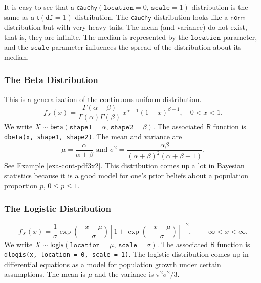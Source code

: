 \documentclass[captions=tableheading]{scrbook}
\begin{document}
It is easy to see that a \(\mathsf{cauchy}(\mathtt{location}=0,\,\mathtt{scale}=1)\) distribution is the same as a \(\mathsf{t}(\mathtt{df}=1)\) distribution. The \(\mathsf{cauchy}\) distribution looks like a \(\mathsf{norm}\) distribution but with very heavy tails. The mean (and variance) do not exist, that is, they are infinite. The median is represented by the \(\mathtt{location}\) parameter, and the \(\mathtt{scale}\) parameter influences the spread of the distribution about its median.
\subsubsection{The Beta Distribution}
\label{sec-1-5-3-2}
\label{sub-The-Beta-Distribution}


This is a generalization of the continuous uniform distribution.
\begin{equation}
f_{X}(x)=\frac{\Gamma(\alpha+\beta)}{\Gamma(\alpha)\Gamma(\beta)}\, x^{\alpha-1}(1-x)^{\beta-1},\quad 0 < x < 1.
\end{equation}
We write \(X\sim\mathsf{beta}(\mathtt{shape1}=\alpha,\,\mathtt{shape2}=\beta)\). The associated \(\mathsf{R}\) function is \texttt{dbeta(x, shape1, shape2)}. The mean and variance are
\begin{equation} 
\mu=\frac{\alpha}{\alpha+\beta}\mbox{ and }\sigma^{2}=\frac{\alpha\beta}{\left(\alpha+\beta\right)^{2}\left(\alpha+\beta+1\right)}.
\end{equation}
See Example \ref{exa-cont-pdf3x2}. This distribution comes up a lot in Bayesian statistics because it is a good model for one's prior beliefs about a population proportion \(p\), \(0\leq p\leq1\).
\subsubsection{The Logistic Distribution}
\label{sec-1-5-3-3}
\label{sub-The-Logistic-Distribution}


\begin{equation}
f_{X}(x)=\frac{1}{\sigma}\exp\left(-\frac{x-\mu}{\sigma}\right)\left[1+\exp\left(-\frac{x-\mu}{\sigma}\right)\right]^{-2},\quad -\infty < x < \infty.
\end{equation}
We write \(X\sim\mathsf{logis}(\mathtt{location}=\mu,\,\mathtt{scale}=\sigma)\). The associated \(\mathsf{R}\) function is \texttt{dlogis(x, location = 0, scale = 1)}. The logistic distribution comes up in differential equations as a model for population growth under certain assumptions. The mean is \(\mu\) and the variance is \(\pi^{2}\sigma^{2}/3\).
\end{document}
